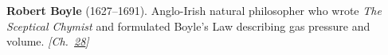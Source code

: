 \textbf{Robert Boyle} (1627–1691). Anglo-Irish natural philosopher who wrote \emph{The Sceptical Chymist} and formulated Boyle's Law describing gas pressure and volume. \emph{[Ch.~\hyperref[ch:negativetemperature]{28}]}

